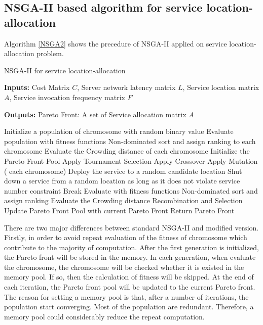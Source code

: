 \documentclass{llncs}
\begin{document}
\subsection{NSGA-II based algorithm for service location-allocation}
Algorithm \ref{NSGA2} shows the precedure of NSGA-II applied on service location-allocation problem.
\begin{algorithm}[htb]
	\caption{NSGA-II for service location-allocation}
	\label{NSGA2}
	\textbf{Inputs:}
		Cost Matrix $C$,
		Server network latency matrix $L$, 
		Service location matrix $A$, 
		Service invocation frequency matrix $F$

	\textbf{Outputs:}
		Pareto Front: A set of Service allocation matrix $A$

	\begin{algorithmic}[1]
		\State Initialize a population of chromosome with random binary value
		\State Evaluate population with fitness functions
		\State Non-dominated sort and assign ranking to each chromosome
		\State Evaluate the Crowding distance of each chromosome
		\State Initialize the Pareto Front Pool
		\State Apply Tournament Selection
		\State Apply Crossover 
		\State Apply Mutation
		\For( each chromosome)
		\State Deploy the service to a random candidate location
		\EndWhile
		\State Shut down a service from a random location as long as it does not violate service number constraint
		\State Break
		\EndIf
		\EndWhile
		\State Evaluate with fitness functions
		\EndIf
		\State Non-dominated sort and assign ranking
		\State Evaluate the Crowding distance
		\EndFor
		\State Recombination and Selection
		\State Update Pareto Front Pool with current Pareto Front
		\EndWhile
		\State Return Pareto Front
	\end{algorithmic}
\end{algorithm}

There are two major differences between standard NSGA-II and modified version. Firstly, in order to avoid repeat evaluation of the fitness
of chromosome which contribute to the majority of computation. After the first generation is initialized, the Pareto front will be 
stored in the memory. In each generation, when evaluate the chromosome, the chromosome will be checked whether it is existed in the memory pool. 
If so, then the calculation of fitness will be skipped. At the end of each iteration, the Pareto front pool will be updated to the current Pareto front.
The reason for setting a memory pool is that, after a number of iterations, the population start converging. 
Most of the population are redundant. Therefore, a memory pool could considerably reduce the repeat computation.
\end{document}
